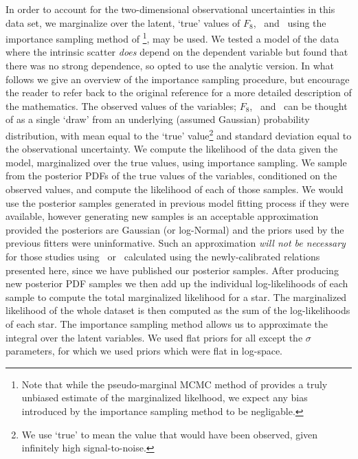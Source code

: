 In order to account for the two-dimensional observational uncertainties in
this data set, we marginalize over the latent, `true' values of $F_8$,
\rhostar\ and \logg\ using the importance sampling method of
\citep{hogg:2010}\footnote{Note that while the pseudo-marginal MCMC method of
\citep{andrieu:2009} provides a truly unbiased estimate of the marginalized
likelhood, we expect any bias introduced by the importance sampling method to
be negligable.}, may be used.
We tested a model of the data where the intrinsic scatter {\it does} depend on
the dependent variable but found that there was no strong dependence, so opted
to use the analytic version.
In what follows we give an overview of the importance sampling procedure, but
encourage the reader to refer back to the original reference for a more
detailed description of the mathematics.
The observed values of the variables; $F_8$, \rhostar\ and \logg\ can be
thought of as a single `draw' from an underlying (assumed Gaussian) probability
distribution, with mean equal to the `true' value\footnote{We use `true' to
mean the value that would have been observed, given infinitely high
signal-to-noise.} and standard deviation equal to the observational
uncertainty.
We compute the likelihood of the data given the model, marginalized over the
true values, using importance sampling.
We sample from the posterior PDFs of the true values of the variables,
conditioned on the observed values, and compute the likelihood of each of those
samples.
We would use the posterior samples generated in previous model fitting process
if they were available, however generating new samples is an acceptable
approximation provided the posteriors are Gaussian (or log-Normal) and the
priors used by the previous fitters were uninformative.
Such an approximation {\it will not be necessary} for those studies using
\rhostar\ or \logg\ calculated using the newly-calibrated relations
presented here, since we have published our posterior samples.
After producing new posterior PDF samples we then add up the individual
log-likelihoods of each sample to compute the total marginalized likelihood
for a star.
The marginalized likelihood of the whole dataset is then computed as the sum
of the log-likelihoods of each star.
The importance sampling method allows us to approximate the integral over the
latent variables.
We used flat priors for all except the $\sigma$ parameters, for which we used
priors which were flat in log-space.

